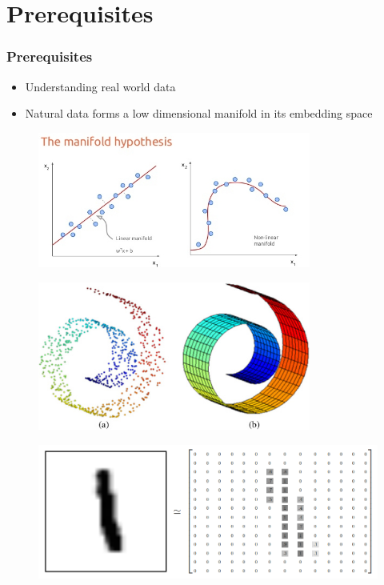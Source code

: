 \documentclass{beamer}
\begin{document}
\section{Prerequisites}


\begin{frame}
\frametitle{Prerequisites}
\begin{itemize}
	\item Understanding real world data
	\item Natural data forms a low dimensional manifold in its embedding space
\end{itemize}
\begin{figure}[h!]
	\centering
	\includegraphics[width=0.8\textwidth]{manifold_hypothesis.jpg}
\end{figure}

\end{frame}
\begin{frame}
\begin{figure}[h!]
	\centering
	\includegraphics[width=0.8\textwidth]{swiss_roll.jpg}
\end{figure}

\end{frame}

\begin{frame}
\begin{figure}[h!]
	\centering
	\includegraphics[width=\textwidth]{mnist_pixel_space.png}
\end{figure}

\end{frame}
\end{document}
